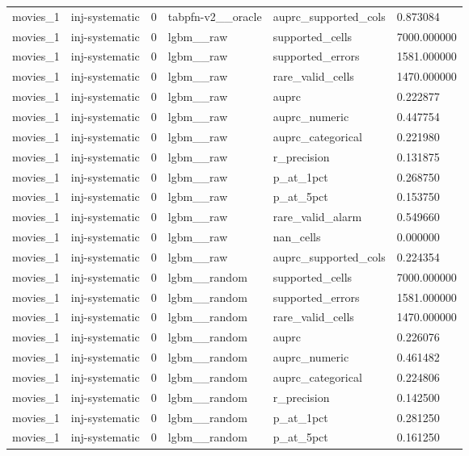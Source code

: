 \begin{tabular}{llllll}
movies\_1 & inj-systematic & 0 & tabpfn-v2\_\_oracle & auprc\_supported\_cols & 0.873084 \\
movies\_1 & inj-systematic & 0 & lgbm\_\_raw & supported\_cells & 7000.000000 \\
movies\_1 & inj-systematic & 0 & lgbm\_\_raw & supported\_errors & 1581.000000 \\
movies\_1 & inj-systematic & 0 & lgbm\_\_raw & rare\_valid\_cells & 1470.000000 \\
movies\_1 & inj-systematic & 0 & lgbm\_\_raw & auprc & 0.222877 \\
movies\_1 & inj-systematic & 0 & lgbm\_\_raw & auprc\_numeric & 0.447754 \\
movies\_1 & inj-systematic & 0 & lgbm\_\_raw & auprc\_categorical & 0.221980 \\
movies\_1 & inj-systematic & 0 & lgbm\_\_raw & r\_precision & 0.131875 \\
movies\_1 & inj-systematic & 0 & lgbm\_\_raw & p\_at\_1pct & 0.268750 \\
movies\_1 & inj-systematic & 0 & lgbm\_\_raw & p\_at\_5pct & 0.153750 \\
movies\_1 & inj-systematic & 0 & lgbm\_\_raw & rare\_valid\_alarm & 0.549660 \\
movies\_1 & inj-systematic & 0 & lgbm\_\_raw & nan\_cells & 0.000000 \\
movies\_1 & inj-systematic & 0 & lgbm\_\_raw & auprc\_supported\_cols & 0.224354 \\
movies\_1 & inj-systematic & 0 & lgbm\_\_random & supported\_cells & 7000.000000 \\
movies\_1 & inj-systematic & 0 & lgbm\_\_random & supported\_errors & 1581.000000 \\
movies\_1 & inj-systematic & 0 & lgbm\_\_random & rare\_valid\_cells & 1470.000000 \\
movies\_1 & inj-systematic & 0 & lgbm\_\_random & auprc & 0.226076 \\
movies\_1 & inj-systematic & 0 & lgbm\_\_random & auprc\_numeric & 0.461482 \\
movies\_1 & inj-systematic & 0 & lgbm\_\_random & auprc\_categorical & 0.224806 \\
movies\_1 & inj-systematic & 0 & lgbm\_\_random & r\_precision & 0.142500 \\
movies\_1 & inj-systematic & 0 & lgbm\_\_random & p\_at\_1pct & 0.281250 \\
movies\_1 & inj-systematic & 0 & lgbm\_\_random & p\_at\_5pct & 0.161250 \\

\end{tabular}
